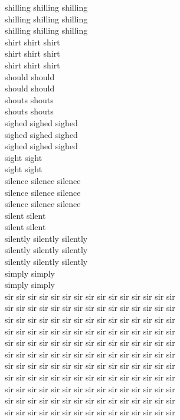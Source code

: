 shilling shilling shilling\\
shilling shilling shilling\\
shilling shilling shilling\\
shirt shirt shirt\\
shirt shirt shirt\\
shirt shirt shirt\\
should should\\
should should\\
shouts shouts\\
shouts shouts\\
sighed sighed sighed\\
sighed sighed sighed\\
sighed sighed sighed\\
sight sight\\
sight sight\\
silence silence silence\\
silence silence silence\\
silence silence silence\\
silent silent\\
silent silent\\
silently silently silently\\
silently silently silently\\
silently silently silently\\
simply simply\\
simply simply\\
sir sir sir sir sir sir sir sir sir sir sir sir sir sir sir\\
sir sir sir sir sir sir sir sir sir sir sir sir sir sir sir\\
sir sir sir sir sir sir sir sir sir sir sir sir sir sir sir\\
sir sir sir sir sir sir sir sir sir sir sir sir sir sir sir\\
sir sir sir sir sir sir sir sir sir sir sir sir sir sir sir\\
sir sir sir sir sir sir sir sir sir sir sir sir sir sir sir\\
sir sir sir sir sir sir sir sir sir sir sir sir sir sir sir\\
sir sir sir sir sir sir sir sir sir sir sir sir sir sir sir\\
sir sir sir sir sir sir sir sir sir sir sir sir sir sir sir\\
sir sir sir sir sir sir sir sir sir sir sir sir sir sir sir\\
sir sir sir sir sir sir sir sir sir sir sir sir sir sir sir\\
